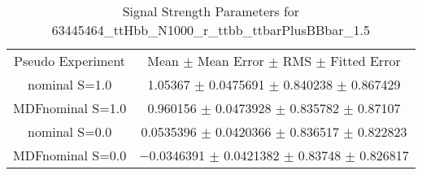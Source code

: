 \begin{table}
\centering
\caption{Signal Strength Parameters for 63445464\_ttHbb\_N1000\_r\_ttbb\_ttbarPlusBBbar\_1.5}
\begin{tabular}{cc}
\toprule
Pseudo Experiment & Mean $\pm$ Mean Error $\pm$ RMS $\pm$ Fitted Error\\
nominal S=1.0 & \num{1.05367} $\pm$ \num{0.0475691} $\pm$ \num{0.840238} $\pm$ \num{0.867429}\\
MDFnominal S=1.0 & \num{0.960156} $\pm$ \num{0.0473928} $\pm$ \num{0.835782} $\pm$ \num{0.87107}\\
nominal S=0.0 & \num{0.0535396} $\pm$ \num{0.0420366} $\pm$ \num{0.836517} $\pm$ \num{0.822823}\\
MDFnominal S=0.0 & \num{-0.0346391} $\pm$ \num{0.0421382} $\pm$ \num{0.83748} $\pm$ \num{0.826817}\\
\bottomrule
\end{tabular}
\end{table}